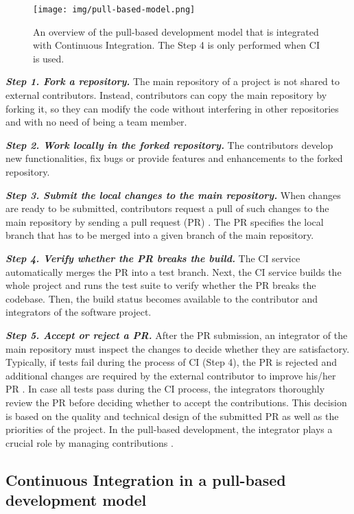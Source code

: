 \begin{figure}[!t]
	\centering
	\texttt{[image: img/pull-based-model.png]}
	\caption{An overview of the pull-based development model that is
	integrated with Continuous Integration. The Step 4 is only performed when CI is used.}
	\label{fig:pull_based_development}
\end{figure}

{\em\textbf{Step 1. Fork a repository.}} The main repository of a project is not shared to external contributors. Instead, contributors can copy the main repository by forking it, so they can modify the code without interfering in other repositories and with no need of being a team member.

{\em\textbf{Step 2. Work locally in the forked repository.}} The contributors develop new functionalities, fix bugs or provide features and enhancements to the forked repository. 

{\em\textbf{Step 3. Submit the local changes to the main repository.}} When changes are ready to be submitted, contributors request a pull of such changes to the main repository by sending a pull request (PR) \citep{Yu2016-cy}. The PR specifies the local branch that has to be merged into a given branch of the main repository.

{\em\textbf{Step 4. Verify whether the PR breaks the build.}} The CI service automatically merges the PR into a test branch. Next, the CI service builds the whole project and runs the test suite to verify whether the PR breaks the codebase. Then, the build status becomes available to the contributor and integrators of the software project.

{\em\textbf{Step 5. Accept or reject a PR.}} 
After the PR submission, an integrator of the main repository must inspect the changes to decide whether they are satisfactory.  Typically, if tests fail during the process of CI (Step 4), the PR is rejected and additional changes are required by the external contributor to improve his/her PR \citep{Yu2016-cy}. In case all tests pass during the CI process, the integrators thoroughly review the PR before deciding whether to accept the contributions. This decision is based on the quality and technical design of the submitted PR as well as the priorities of the project.  In the pull-based development, the integrator plays a crucial role by managing contributions \citep{Gousios2015-ui}.

\subsection{\textbf{Continuous Integration in a pull-based development model}}
\label{subsec:pull_based_with_ci}

